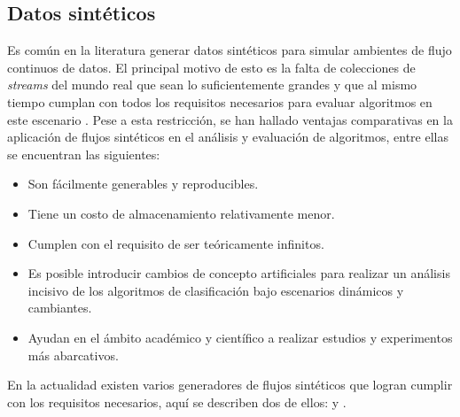 \subsection{Datos sintéticos}
\label{stream_syn}

Es común en la literatura generar datos sintéticos para simular ambientes de
flujo continuos de datos. El principal motivo de esto es la falta de colecciones
de \textit{streams} del mundo real que sean lo suficientemente grandes y que al
mismo tiempo cumplan con todos los requisitos necesarios para evaluar algoritmos
en este escenario \cite{kirkby_improving_2007}. Pese a esta restricción, se han
hallado ventajas comparativas en la aplicación de flujos sintéticos en el
análisis y evaluación de algoritmos, entre ellas se encuentran las siguientes:

\begin{itemize}

	\item Son fácilmente generables y reproducibles.

	\item Tiene un costo de almacenamiento relativamente menor.

	\item Cumplen con el requisito de ser teóricamente infinitos.

	\item Es posible introducir cambios de concepto artificiales para realizar un
	      análisis incisivo de los algoritmos de clasificación bajo escenarios
	      dinámicos y cambiantes.

	\item Ayudan en el ámbito académico y científico a realizar estudios y
	      experimentos más abarcativos.

\end{itemize}

En la actualidad existen varios generadores de flujos sintéticos que logran
cumplir con los requisitos necesarios, aquí se describen dos de ellos:
 y .

